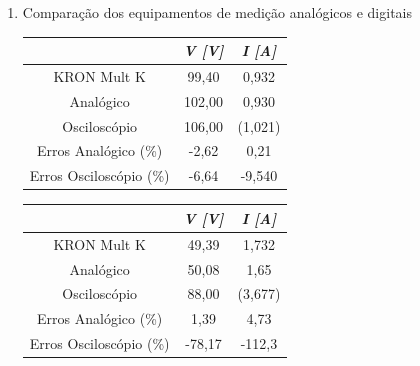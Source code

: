 \documentclass[a4paper,12pt,oneside,openany,table,xcdraw]{article}
\begin{document}
\begin{enumerate}[1 - ]
\item Comparação dos equipamentos de medição analógicos e digitais \\
\begin{table}[H]
\centering
\def\arraystretch{1.35}
\captionsetup{font=scriptsize}
 \label{cA}
\begin{tabular}{c|c|c|}
\cline{2-3}
                                              & \textit{V {[}V{]}} & \textit{I {[}A{]}} \\ \hline
\multicolumn{1}{|c|}{KRON Mult K}             & 99,40              & 0,932              \\ \hline
\multicolumn{1}{|c|}{Analógico}               & 102,00             & 0,930              \\ \hline
\multicolumn{1}{|c|}{Osciloscópio}            & 106,00             & (1,021)             \\ \hline %
\multicolumn{1}{|c|}{Erros Analógico (\%)}    & -2,62              & 0,21               \\ \hline
\multicolumn{1}{|c|}{Erros Osciloscópio (\%)} & -6,64              & -9,540             \\ \hline
\end{tabular}
\end{table}

\begin{table}[H]
\centering
\def\arraystretch{1.35}
\captionsetup{font=scriptsize}
 \label{cB}
\begin{tabular}{c|c|c|}
\cline{2-3}
                                              & \textit{V {[}V{]}} & \textit{I {[}A{]}} \\ \hline
\multicolumn{1}{|c|}{KRON Mult K}             & 49,39             & 1,732           \\ \hline
\multicolumn{1}{|c|}{Analógico}               & 50,08               & 1,65             \\ \hline
\multicolumn{1}{|c|}{Osciloscópio}            & 88,00              & (3,677)            \\ \hline
\multicolumn{1}{|c|}{Erros Analógico (\%)}   & 1,39            & 4,73              \\ \hline
\multicolumn{1}{|c|}{Erros Osciloscópio (\%)} & -78,17        & -112,3                   \\ \hline %
\end{tabular}
\end{table}


\end{enumerate}
\end{document}
